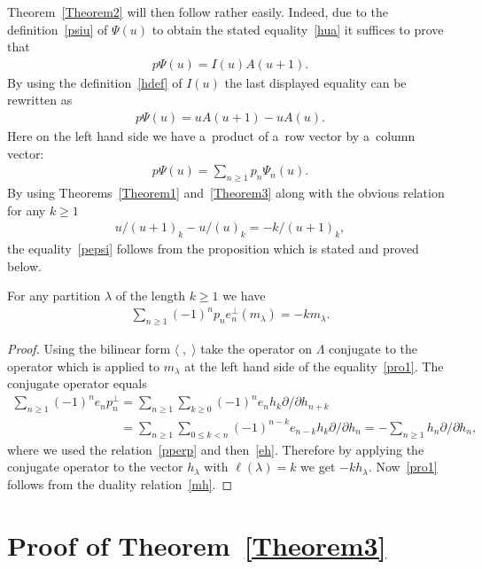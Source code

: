 Theorem~\ref{Theorem2} will then follow rather easily.
Indeed, due to the def\/inition~\eqref{psiu} of $\Psi(u)$ to obtain the stated equality~\eqref{hua} it
suf\/f\/ices to prove that
\begin{gather*}%
p\Psi(u)=I(u)A(u+1).
\end{gather*}
By using the def\/inition~\eqref{hdef} of $I(u)$ the last displayed equality can be rewritten as
\begin{gather}
\label{pepsi}
p\Psi(u)=uA(u+1)-uA(u).
\end{gather}
Here on the left hand side we have a~product of a~row vector by a~column vector:
\begin{gather*}
p\Psi(u)=\sum_{n\ge1}p_n\Psi_n(u).
\end{gather*}
By using Theorems~\ref{Theorem1} and~\ref{Theorem3} along with the obvious relation for any $k\ge1$
\begin{gather*}
u/(u+1)_k-u/(u)_k=-k/(u+1)_k,
\end{gather*}
the equality~\eqref{pepsi} follows from the proposition which is
stated and proved below.
\begin{proposition}\label{Prop1}
For any partition $\lambda$ of the length $k\ge1$ we have
\begin{gather}\label{pro1}
\sum_{n\ge1}(-1)^np_ne_n^{\perp}(m_\lambda)=-km_\lambda.
\end{gather}
\end{proposition}
\begin{proof}
Using the bilinear form $\langle\;,\;\rangle$ take the operator on $\Lambda$ conjugate to the operator which
is applied to $m_\lambda$ at the left hand side of the equality~\eqref{pro1}.
The conjugate operator equals
\begin{gather*}
\sum_{n\ge1}(-1)^ne_np_n^{\perp}
=\sum_{n\ge1}\sum_{k\ge0}(-1)^ne_nh_k\partial /\partial h_{n+k}
\\
\phantom{\sum_{n\ge1}(-1)^ne_np_n^{\perp}}
=\sum_{n\ge1}\sum_{0\le k<n}(-1)^{n-k}e_{n-k}
h_k\partial /\partial h_n=-\sum_{n\ge1}h_n\partial /\partial h_n,
\end{gather*}
where we used the relation~\eqref{pperp} and then~\eqref{eh}.
Therefore by applying the conjugate operator to the vector $h_\lambda$ with $\ell(\lambda)=k$ we get
$- kh_\lambda$.
Now~\eqref{pro1} follows from the duality relation~\eqref{mh}.
\end{proof}

\section{Proof of Theorem~\ref{Theorem3}}\label{Section8}

